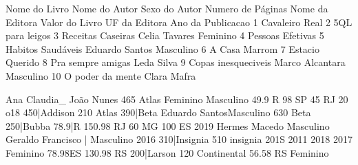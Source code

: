 Nome do Livro Nome do Autor Sexo do Autor Numero de Páginas Nome da Editora Valor do Livro UF da Editora Ano da Publicacao
1 Cavaleiro Real
2 5QL para leigos
3 Receitas Caseiras Celia Tavares Feminino
4 Pessoas Efetivas
5 Habitos Saudáveis Eduardo Santos Masculino
6 A Casa Marrom
7 Estacio Querido
8 Pra sempre amigas Leda Silva
9 Copas inesqueciveis Marco Alcantara Masculino
10 O poder da mente Clara Mafra

Ana Claudia_
João Nunes
465 Atlas
Feminino
Masculino
49.9 R
98 SP
45 RJ
20
o18
450|Addison
210 Atlas
390|Beta
Eduardo SantosMasculino
630 Beta
250|Bubba
78.9|R
150.98 RJ
60 MG
100 ES
2019
Hermes Macedo Masculino
Geraldo Francisco | Masculino
2016
310|Insignia
510 insignia
201S
2011
2018
2017
Feminino
78.98ES
130.98 RS
200|Larson
120 Continental
56.58 RS
Feminino



